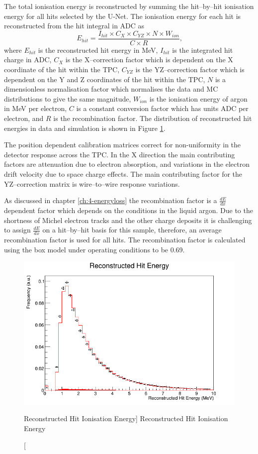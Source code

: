The total ionisation energy is reconstructed by summing the hit--by--hit
ionisation energy for all hits selected by the U-Net. The ionisation energy for
each hit is reconstructed from the hit integral in ADC as 
\begin{equation}
	E_{hit} = \frac{I_{hit} \times C_X \times C_{YZ} \times N \times W_{ion}}{C \times R}\mbox{,}
\end{equation}
where $E_{hit}$ is the reconstructed hit energy in MeV, $I_{hit}$ is the
integrated hit charge in ADC, $C_X$ is the X--correction factor which is
dependent on the X coordinate of the hit within the TPC, $C_{YZ}$ is the 
YZ--correction factor which is dependent on the Y and Z coordinates 
of the hit within the TPC, $N$ is a dimensionless normalisation factor which
normalises the data and MC distributions to give the same magnitude, $W_{ion}$
is the ionisation energy of argon in MeV per electron, $C$ is a constant
conversion factor which has units ADC per electron, and $R$ is the
recombination factor. The distribution of reconstructed hit energies in
\protodune{} data and simulation is shown in Figure \ref{fig:hit_ion_reco}.

The position dependent calibration matrices correct for non-uniformity in the
detector response across the TPC. In the X direction the main contributing
factors are attenuation due to electron absorption, and variations in the
electron drift velocity due to space charge effects. The main contributing
factor for the YZ--correction matrix is wire--to--wire response variations.

As discussed in chapter \ref{ch:4-energyloss} the recombination factor is a
$\frac{dE}{dx}$ dependent factor which depends on the conditions in the liquid
argon. Due to the shortness of Michel electron tracks and the other charge 
deposits it is challenging to assign $\frac{dE}{dx}$ on a hit--by--hit 
basis for this sample, therefore, an average recombination factor is used for 
all hits. The recombination factor is calculated using the box model 
\cite{TODO} under \protodune{} operating conditions to be 0.69.

\begin{figure}
	\centering
	\includegraphics[width=\textwidth]{figures/hit_ion_reco.png}
	\caption
	[Reconstructed Hit Ionisation Energy]
	{Reconstructed Hit Ionisation Energy}
	\label{fig:hit_ion_reco}
\end{figure}

